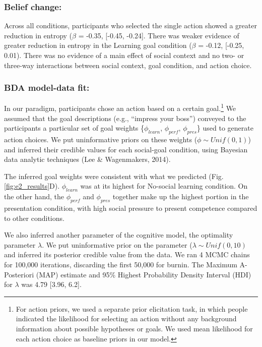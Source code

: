 \documentclass[10pt, letterpaper]{article}
\begin{document}
\subsubsection{Belief change:}\label{belief-change-1}

Across all conditions, participants who selected the single action
showed a greater reduction in entropy (\(\beta\) = -0.35, {[}-0.45,
-0.24{]}. There was weaker evidence of greater reduction in entropy in
the Learning goal condition (\(\beta\) = -0.12, {[}-0.25, 0.01). There
was no evidence of a main effect of social context and no two- or
three-way interactions between social context, goal condition, and
action choice.

\subsubsection{BDA model-data fit:}\label{bda-model-data-fit}

In our paradigm, participants chose an action based on a certain
goal.\footnote{For action priors, we used a separate prior elicitation task, in which people indicated the likelihood for selecting an action without any background information about possible hypotheses or goals. We used mean likelihood for each action choice as baseline priors in our model.}
We assumed that the goal descriptions (e.g., ``impress your boss'')
conveyed to the participants a particular set of goal weights
\{\(\phi_{learn}\), \(\phi_{perf}\), \(\phi_{pres}\)\} used to generate
action choices. We put uninformative priors on these weights
(\(\phi \sim Unif(0,1)\)) and inferred their credible values for each
social-goal condition, using Bayesian data analytic techniques (Lee \&
Wagenmakers, 2014).

The inferred goal weights were consistent with what we predicted (Fig.
\ref{fig:e2_results}D). \(\phi_{learn}\) was at its highest for
No-social learning condition. On the other hand, the \(\phi_{perf}\) and
\(\phi_{pres}\) together make up the highest portion in the presentation
condition, with high social pressure to present competence compared to
other conditions.

We also inferred another parameter of the cognitive model, the
optimality parameter \(\lambda\). We put uninformative prior on the
parameter (\(\lambda \sim Unif(0,10)\) and inferred its posterior
credible value from the data. We ran 4 MCMC chains for 100,000
iterations, discarding the first 50,000 for burnin. The Maximum A-
Posteriori (MAP) estimate and 95\% Highest Probability Density Interval
(HDI) for \(\lambda\) was 4.79 {[}3.96, 6.2{]}.
\end{document}
